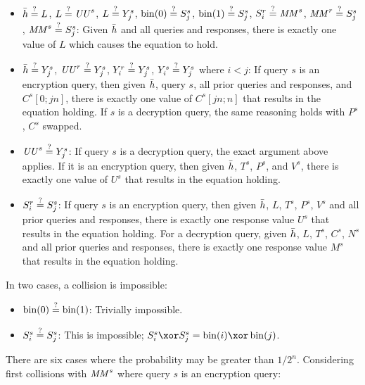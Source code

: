 \documentclass[hctr2.tex]{subfiles}
\begin{document}

\begin{itemize}
    \item
    \(\bar{h} \stackrel{\text{?}}{=} L\),
    \(L \stackrel{\text{?}}{=} \mathit{UU}^s\),
    \(L \stackrel{\text{?}}{=} Y_j^s\),
    \(\operatorname{bin}(0) \stackrel{\text{?}}{=} S_j^s\),
    \(\operatorname{bin}(1) \stackrel{\text{?}}{=} S_j^s\),
    \(S_i^r \stackrel{\text{?}}{=} \mathit{MM}^s\),
    \(\mathit{MM}^r \stackrel{\text{?}}{=} S_j^s\),
    \(\mathit{MM}^s \stackrel{\text{?}}{=} S_j^s\):
    Given \(\bar{h}\) and all queries and responses,
    there is exactly one value of \(L\)
    which causes the equation to hold.
    \item
    \(\bar{h} \stackrel{\text{?}}{=} Y_j^s\),
    \(\mathit{UU}^r \stackrel{\text{?}}{=} Y_j^s\),
    \(Y_i^r \stackrel{\text{?}}{=} Y_j^s\),
    \(Y_i^s \stackrel{\text{?}}{=} Y_j^s\) where \(i < j\): 
    If query \(s\) is an encryption query,
    then given \(\bar{h}\), query \(s\), 
    all prior queries and responses, and
    \(C^s[0;jn]\), there is exactly one value of
    \(C^s[jn;n]\) that results in the equation holding.
    If \(s\) is a decryption query, the same reasoning holds
    with \(P^s\), \(C^s\) swapped.
    \item 
    \(\mathit{UU}^s \stackrel{\text{?}}{=} Y_j^s\):
    If query \(s\) is a decryption query,
    the exact argument above applies.
    If it is an encryption query,
    then given \(\bar{h}\), \(T^s\), \(P^s\),
    and \(V^s\), there is exactly
    one value of \(U^s\) that results
    in the equation holding.
    \item 
    \(S_i^r \stackrel{\text{?}}{=} S_j^s\):
    If query \(s\) is an encryption query,
    then given \(\bar{h}\), \(L\), \(T^s\),
    \(P^s\), \(V^s\)
    and all prior queries and responses,
    there is exactly one response value \(U^s\)
    that results in the equation holding.
    For a decryption query, 
    given \(\bar{h}\), \(L\), \(T^s\),
    \(C^s\), \(N^s\)
    and all prior queries and responses,
    there is exactly one response value \(M^s\)
    that results in the equation holding.
\end{itemize}

In two cases, a collision is impossible:

\begin{itemize}
    \item \(\operatorname{bin}(0) \stackrel{\text{?}}{=} \operatorname{bin}(1)\): 
    Trivially impossible.
    \item 
    \(S_i^s \stackrel{\text{?}}{=} S_j^s\):
    This is impossible; 
    \(S_i^s \xor S_j^s = \fromint(i) \xor \fromint(j)\).
\end{itemize}

There are six cases where the probability may
be greater than \(1/2^n\).
Considering first collisions with \(\mathit{MM}^s\) where
query \(s\) is an encryption query:
\end{document}
